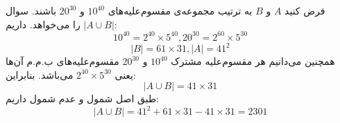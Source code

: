 	\p
فرض کنید 
$A$
و 
$B$
به ترتیب مجموعه‌ی مقسوم‌علیه‌های 
$10^{40}$
و 
$20^{30}$
باشند. سوال 
$|A \cup B|$
را می‌خواهد. داریم:
$$10^{40} = 2^{40}\times5^{40}, 20^{30} = 2^{60}\times5^{30}$$
$$|B| = 61\times31, |A| = 41^2$$
همچنین می‌دانیم هر مقسوم‌علیه مشترک 
$10^{40}$
و 
$20^{30}$
مقسوم‌علیه‌های ب.م.م آن‌ها یعنی 
$2^{40}\times5^{30}$
می‌باشد. بنابراین:
$$|A \cup B| = 41 \times 31$$
طبق اصل شمول و عدم شمول داریم:
$$|A \cup B| = 41^2 + 61 \times 31 - 41 \times 31 = 2301$$



